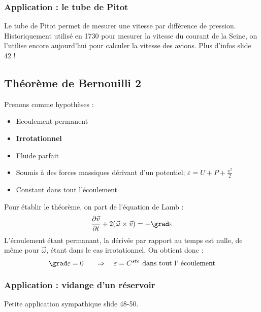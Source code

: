 		\subsubsection{Application : le tube de Pitot}
		Le tube de Pitot permet de mesurer une vitesse par différence de pression. 
		Historiquement utilisé en 1730 pour mesurer la vitesse du courant de la Seine, 
		on l'utilise encore aujourd'hui pour calculer la vitesse des avions. Plus d'infos
		slide 42 !
		
	
	\subsection{Théorème de Bernouilli 2}
	Prenons comme hypothèses :
	\begin{itemize}
	\item Ecoulement permanent
	\item \textbf{Irrotationnel}
	\item Fluide parfait
	\item Soumis à des forces massiques dérivant d'un potentiel; $\varepsilon = U + P + 
	\frac{v^2}{2}$
	\item Constant dans tout l'écoulement
	\end{itemize}
	
	Pour établir le théorème, on part de l'équation de Lamb :
	\begin{equation}
	\frac{\partial\vec v}{\partial t}+2(\vec{\omega}\times\vec{v}) = -\grad \varepsilon
	\end{equation}
	L'écoulement étant permanant, la dérivée par rapport au temps est nulle, de même pour
	$\vec{\omega}$, étant dans le cas irrotationnel. On obtient donc :
	\begin{equation}
	\grad \varepsilon = 0\ \ \ \ \ \Rightarrow\ \ \ \varepsilon = C^{ste}\ \text{dans tout l'
	écoulement}
	\end{equation}
	
		\subsubsection{Application : vidange d'un réservoir}
		Petite application sympathique slide 48-50.
	
	
	
